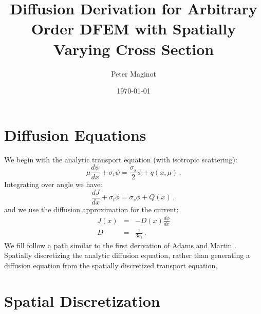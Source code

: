 \documentclass[11pt]{article}
\newcommand{\benum}{\begin{equation}}
\newcommand{\eenum}{\end{equation}}
\newcommand{\be}{\begin{equation*}}
\newcommand{\ee}{\end{equation*}}
\newcommand{\beanum}{\begin{eqnarray}}
\newcommand{\eeanum}{\end{eqnarray}}
\newcommand{\p}{\ensuremath{ d}}
\newcommand{\pec}{\, ,}
\newcommand{\pep}{\, .}
\begin{document}
\author{Peter Maginot}
\date{\today}
\title{Diffusion Derivation for Arbitrary Order DFEM with Spatially Varying Cross Section}
\maketitle
\section{Diffusion Equations}
We begin with the analytic transport equation (with isotropic scattering):
\be
\mu\frac{\p \psi}{\p x} + \sigma_t \psi = \frac{\sigma_s}{2} \phi + q(x,\mu) \pep
\ee
Integrating over angle we have:
\benum
\frac{\p J}{\p x} + \sigma_t \phi = \sigma_s \phi + Q(x) \pec
\label{eq:diff}
\eenum
and we use the diffusion approximation for the current:
\begin{subequations}
\label{eq:J_def}
\beanum
J(x) &=& -D(x)\frac{\p \phi}{\p x} \\
D &=& \frac{1}{3 \sigma_t} \pep
\eeanum
\end{subequations}
We fill follow a path similar to the first derivation of Adams and Martin \cite{M4S}.  
Spatially discretizing the analytic diffusion equation, rather than generating a diffusion equation from the spatially discretized transport equation.

\section{Spatial Discretization}
\end{document}
